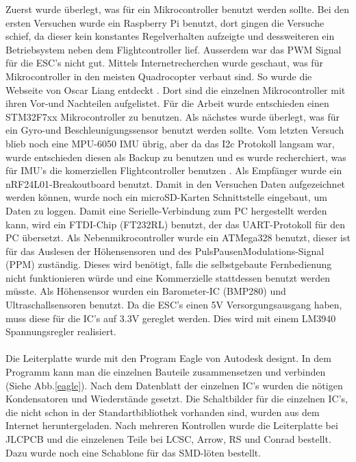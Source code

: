\documentclass[12pt,a4paper, ngerman]{article}
\begin{document}
\fi
Zuerst wurde überlegt, was für ein Mikrocontroller benutzt werden sollte. Bei den ersten Versuchen wurde ein Raspberry Pi benutzt, dort gingen die Versuche schief, da dieser kein konstantes Regelverhalten aufzeigte und dessweiteren ein Betriebsystem neben dem Flightcontroller lief. Ausserdem war das PWM Signal für die ESC's nicht gut. Mittels Internetrecherchen wurde geschaut, was für Mikrocontroller in den meisten Quadrocopter verbaut sind. So wurde die Webseite von Oscar Liang entdeckt \cite{website:OS_MCU_COLL}. Dort sind die einzelnen Mikrocontroller mit ihren Vor-und Nachteilen aufgelistet. Für die Arbeit wurde entschieden einen STM32F7xx Mikrocontroller zu benutzen. Als nächstes wurde überlegt, was für ein Gyro-und Beschleunigungssensor benutzt werden sollte. Vom letzten Versuch blieb noch eine MPU-6050 IMU übrig, aber da das I2c Protokoll langsam war, wurde entschieden diesen als Backup zu benutzen und es wurde recherchiert, was für IMU's die komerziellen Flightcontroller benutzen \cite{website:IMU_COLL}. Als Empfänger wurde ein nRF24L01-Breakoutboard benutzt. Damit in den Versuchen Daten aufgezeichnet werden können, wurde noch ein microSD-Karten Schnittstelle eingebaut, um Daten zu loggen. Damit eine Serielle-Verbindung zum PC hergestellt werden kann, wird ein FTDI-Chip (FT232RL) benutzt, der das UART-Protokoll für den PC übersetzt. Als Nebenmikrocontroller wurde ein ATMega328 benutzt, dieser ist für das Auslesen der Höhensensoren und des PulsPausenModulations-Signal (PPM) zuständig. Dieses wird benötigt, falls die selbstgebaute Fernbedienung nicht funktionieren würde und eine Kommerzielle stattdessen benutzt werden müsste. Als Höhensensor wurden ein Barometer-IC (BMP280) und Ultraschallsensoren benutzt. Da die ESC's einen 5V Versorgungsausgang haben, muss diese für die IC's auf 3.3V gereglet werden. Dies wird mit einem LM3940 Spannungsregler realisiert. \\ \\ Die Leiterplatte wurde mit den Program Eagle von Autodesk designt. In dem Programm kann man die einzelnen Bauteile zusammensetzen und verbinden (Siehe Abb.\ref{eagle}). Nach dem Datenblatt der einzelnen IC's wurden die nötigen Kondensatoren und Wiederstände gesetzt. Die Schaltbilder für die einzelnen IC's, die nicht schon in der Standartbibliothek vorhanden sind, wurden aus dem Internet heruntergeladen. Nach mehreren Kontrollen wurde die Leiterplatte bei JLCPCB und die einzelenen Teile bei LCSC, Arrow, RS und Conrad bestellt. Dazu wurde noch eine Schablone für das SMD-löten bestellt. 
\end{document}
